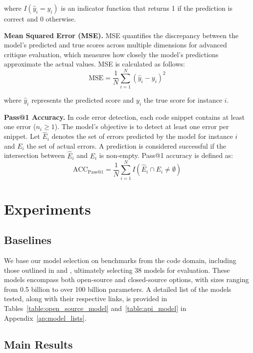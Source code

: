 \documentclass[11pt, a4paper, logo, copyright, nonumbering, amsart]{map}
\begin{document}
\begin{CJK*}{UTF8}{gbsn}
\noindent where $I(\hat{y}_i = y_i)$ is an indicator function that returns 1 if the prediction is correct and 0 otherwise.

\noindent \textbf{Mean Squared Error (MSE).} MSE quantifies the discrepancy between the model's predicted and true scores across multiple dimensions for advanced critique evaluation, which measures how closely the model's predictions approximate the actual values. MSE is calculated as follows:
\begin{equation}
    \text{MSE} = \frac{1}{N} \sum_{i=1}^{N} (\hat{y}_i - y_i)^2
\end{equation}

\noindent where $\hat{y}_i$ represents the predicted score and $y_i$ the true score for instance $i$. 

\noindent \textbf{Pass@1 Accuracy.} In code error detection, each code snippet contains at least one error ($n_i \geq 1$). The model's objective is to detect at least one error per snippet. Let $\hat{E}_i$ denotes the set of errors predicted by the model for instance $i$ and $E_i$ the set of actual errors. A prediction is considered successful if the intersection between $\hat{E}_i$ and $E_i$ is non-empty. Pass@1 accuracy is defined as:
\begin{equation}
    \text{ACC}_{\text{Pass@1}} = \frac{1}{N} \sum_{i=1}^{N} I(\hat{E}_i \cap E_i \neq \emptyset)
\end{equation}

\section{Experiments}

\subsection{Baselines}

We base our model selection on benchmarks from the code domain, including those outlined in \cite{liu2024mdeval} and \cite{liu2024fullstack}, ultimately selecting 38 models for evaluation. These models encompass both open-source and closed-source options, with sizes ranging from 0.5 billion to over 100 billion parameters. A detailed list of the models tested, along with their respective links, is provided in Tables~\ref{table:open_source_model} and~\ref{table:api_model} in Appendix~\ref{ap:model_lists}.

\subsection{Main Results} 


\end{CJK*}
\end{document}
